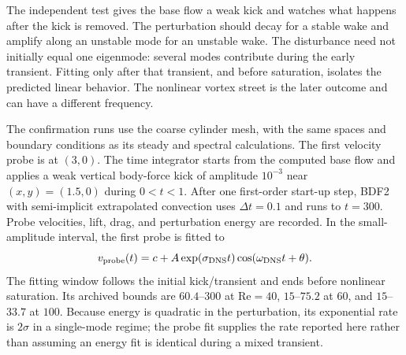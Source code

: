 The independent test gives the base flow a weak kick and watches what happens after the kick is removed. The perturbation should decay for a stable wake and amplify along an unstable mode for an unstable wake. The disturbance need not initially equal one eigenmode: several modes contribute during the early transient. Fitting only after that transient, and before saturation, isolates the predicted linear behavior. The nonlinear vortex street is the later outcome and can have a different frequency.


The confirmation runs use the coarse cylinder mesh, with the same spaces and boundary conditions as its steady and spectral calculations. The first velocity probe is at $(3,0)$. The time integrator starts from the computed base flow and applies a weak vertical body-force kick of amplitude $10^{-3}$ near $(x,y)=(1.5,0)$ during $0<t<1$. After one first-order start-up step, BDF2 with semi-implicit extrapolated convection uses $\Delta t=0.1$ and runs to $t=300$. Probe velocities, lift, drag, and perturbation energy are recorded. In the small-amplitude interval, the first probe is fitted to
\begin{equation}
v_{\rm probe}(t)=c+A\exp(\sigma_{\rm DNS}t)\cos(\omega_{\rm DNS}t+\theta).
\label{eq:cylinder-fit}
\end{equation}
The fitting window follows the initial kick/transient and ends before nonlinear saturation. Its archived bounds are $60.4$--$300$ at $\mathrm{Re}=40$, $15$--$75.2$ at $60$, and $15$--$33.7$ at $100$. Because energy is quadratic in the perturbation, its exponential rate is $2\sigma$ in a single-mode regime; the probe fit supplies the rate reported here rather than assuming an energy fit is identical during a mixed transient.

